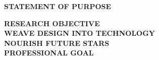 \documentclass[12pt, a4paper]{article}
\begin{document}
\begin{center}
{\Large \textbf{STATEMENT OF PURPOSE}}
\end{center}


\noindent 


\normalsize
\noindent
% 
 



\noindent
\textbf{RESEARCH OBJECTIVE}\\
 



\noindent
\textbf{WEAVE DESIGN INTO TECHNOLOGY}\\


\noindent
\textbf{NOURISH FUTURE STARS}\\


%


\noindent
\textbf{PROFESSIONAL GOAL}\\

%
%
%
%
%
%

\noindent

\end{document}
